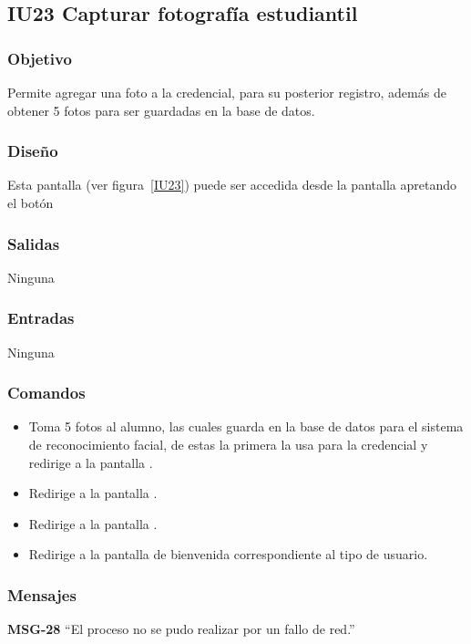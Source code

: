 
\subsection{IU23 Capturar fotografía estudiantil}

\subsubsection{Objetivo}
   Permite agregar una foto a la credencial, para su posterior registro, además de obtener 5 fotos para ser guardadas en la base de datos.
\subsubsection{Diseño}
    Esta pantalla  (ver figura~\ref{IU23}) puede ser accedida desde la pantalla  apretando el botón 


\subsubsection{Salidas}
Ninguna
\subsubsection{Entradas}
Ninguna
\subsubsection{Comandos}
\begin{itemize}
    \item {} Toma 5 fotos al alumno, las cuales guarda en la base de datos para el sistema de reconocimiento facial, de estas la primera la usa para la credencial y redirige a la pantalla .
    \item {} Redirige a la pantalla .
    \item {} Redirige a la pantalla .
    \item {} Redirige a la pantalla de bienvenida correspondiente al tipo de usuario.
    
\end{itemize}

\subsubsection{Mensajes}

\begin{Citemize}
    \item {\bf MSG-28}  ``El proceso no se pudo realizar por un fallo de red.''
\end{Citemize}

